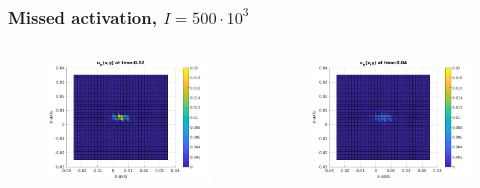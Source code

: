 \documentclass[9pt]{beamer}
\begin{document}
\begin{frame}
	\frametitle{Missed activation, $I = 500\cdot 10^3$}
	\begin{columns}
		\begin{column}{0.25\textwidth}
			\begin{figure}[h]
				\includegraphics[width=\textwidth]{tc1-1/002.jpg}
			\end{figure}
		\end{column}
		\begin{column}{0.25\textwidth}
			\begin{figure}[h]
				\includegraphics[width=\textwidth]{tc1-1/004.jpg}
			\end{figure}
		\end{column}

\end{columns}
\end{frame}
\end{document}
